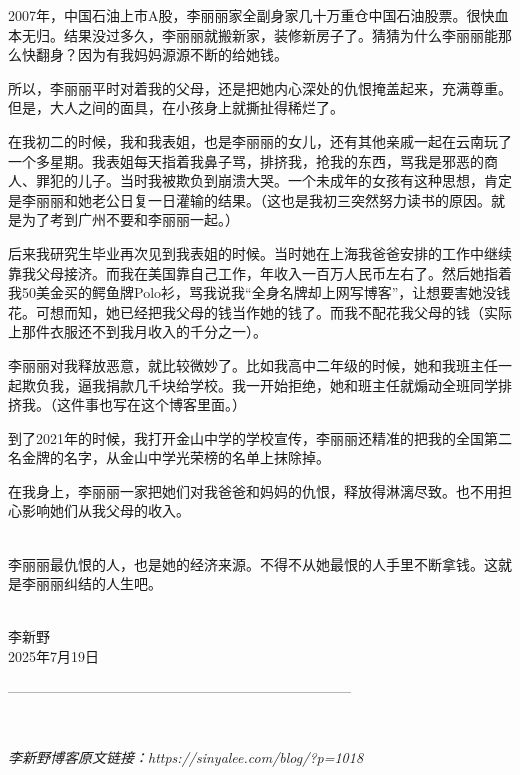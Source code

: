 2007年，中国石油上市A股，李丽丽家全副身家几十万重仓中国石油股票。很快血本无归。结果没过多久，李丽丽就搬新家，装修新房子了。猜猜为什么李丽丽能那么快翻身？因为有我妈妈源源不断的给她钱。

所以，李丽丽平时对着我的父母，还是把她内心深处的仇恨掩盖起来，充满尊重。但是，大人之间的面具，在小孩身上就撕扯得稀烂了。

在我初二的时候，我和我表姐，也是李丽丽的女儿，还有其他亲戚一起在云南玩了一个多星期。我表姐每天指着我鼻子骂，排挤我，抢我的东西，骂我是邪恶的商人、罪犯的儿子。当时我被欺负到崩溃大哭。一个未成年的女孩有这种思想，肯定是李丽丽和她老公日复一日灌输的结果。（这也是我初三突然努力读书的原因。就是为了考到广州不要和李丽丽一起。）

后来我研究生毕业再次见到我表姐的时候。当时她在上海我爸爸安排的工作中继续靠我父母接济。而我在美国靠自己工作，年收入一百万人民币左右了。然后她指着我50美金买的鳄鱼牌Polo衫，骂我说我“全身名牌却上网写博客”，让想要害她没钱花。可想而知，她已经把我父母的钱当作她的钱了。而我不配花我父母的钱（实际上那件衣服还不到我月收入的千分之一）。

李丽丽对我释放恶意，就比较微妙了。比如我高中二年级的时候，她和我班主任一起欺负我，逼我捐款几千块给学校。我一开始拒绝，她和班主任就煽动全班同学排挤我。（这件事也写在这个博客里面。）

到了2021年的时候，我打开金山中学的学校宣传，李丽丽还精准的把我的全国第二名金牌的名字，从金山中学光荣榜的名单上抹除掉。

在我身上，李丽丽一家把她们对我爸爸和妈妈的仇恨，释放得淋漓尽致。也不用担心影响她们从我父母的收入。

\ \\
李丽丽最仇恨的人，也是她的经济来源。不得不从她最恨的人手里不断拿钱。这就是李丽丽纠结的人生吧。

\ \\
李新野\\
2025年7月19日

--------------------------------------------------------------------------

\

\textit{李新野博客原文链接：https://sinyalee.com/blog/?p=1018}
